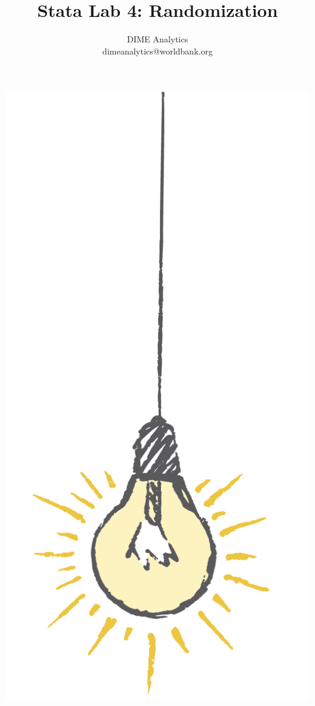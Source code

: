 \documentclass{tufte-handout}
\title{Stata Lab 4: Randomization}
\author{DIME Analytics \\ dimeanalytics@worldbank.org}
\begin{document}
\maketitle%

\begin{marginfigure}%
  \includegraphics[width=\linewidth]{light.png}
\end{marginfigure}
\end{document}
